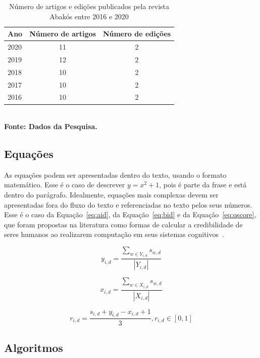 \documentclass[a4paper,12pt]{article}
\begin{document}
\begin{table}[ht]
	\centering
	\caption{Número de artigos e edições publicados pela revista Abakós entre 2016 e 2020}
	\label{tab:tabela1}
	\begin{tabular}{l|c|c}
  \hline
    \textbf{Ano}	& \textbf{Número de artigos} & \textbf{Número de edições} \\
    \hline
     2020	& 11 &  2 \\
     2019	& 12 &  2 \\
     2018	& 10 &  2 \\
     2017   & 10  &  2 \\
     2016	& 10  &  2 \\
     \hline
 \end{tabular}
	{\footnotesize\\ \textbf{Fonte: Dados da Pesquisa.}}
\end{table}


\subsection{\esp Equações}

As equações podem ser apresentadas dentro do texto, usando o formato matemático. Esse é o caso de descrever $y=x^2+1$, pois é parte da frase e está dentro do parágrafo. Idealmente, equações mais complexas devem ser apresentadas fora do fluxo do texto e referenciadas no texto pelos seus números. Esse é o caso da Equação~\ref{eq:aid}, da Equação~\ref{eq:bid} e da Equação~\ref{eq:qscore}, que foram propostas na literatura como formas de calcular a credibilidade de seres humanos ao realizarem computação em seus sistemas cognitivos~\cite{ponciano2018agreement}. 

\begin{equation}
\label{eq:aid}
y_{i,d}=\frac{\displaystyle\sum_{w\in Y_{i,d}}s_{w,d}}{|Y_{i,d}|}
\end{equation}

\begin{equation}
\label{eq:bid}
x_{i,d}=\frac{\displaystyle\sum_{w\in X_{i,d}}s_{w,d}}{|X_{i,d}|}
\end{equation}

\begin{equation}
\label{eq:qscore}
r_{i,d} = \frac{s_{i,d} + y_{i,d}-x_{i,d} + 1}{3}, r_{i,d}\in[0,1]
\end{equation}

\subsection{Algoritmos}
\end{document}
